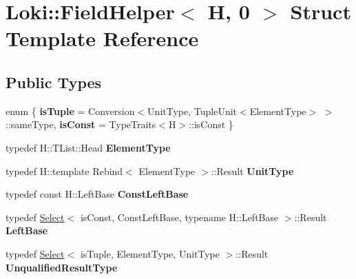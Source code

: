 \hypertarget{structLoki_1_1FieldHelper_3_01H_00_010_01_4}{}\section{Loki\+:\+:Field\+Helper$<$ H, 0 $>$ Struct Template Reference}
\label{structLoki_1_1FieldHelper_3_01H_00_010_01_4}
\subsection*{Public Types}
\begin{DoxyCompactItemize}
\item 
\hypertarget{structLoki_1_1FieldHelper_3_01H_00_010_01_4_aee3342286b1cd06bef64f33a0c847fde}{}enum \{ {\bfseries is\+Tuple} = Conversion$<$Unit\+Type, Tuple\+Unit$<$Element\+Type$>$ $>$\+:\+:same\+Type, 
{\bfseries is\+Const} = Type\+Traits$<$H$>$\+:\+:is\+Const
 \}\label{structLoki_1_1FieldHelper_3_01H_00_010_01_4_aee3342286b1cd06bef64f33a0c847fde}

\item 
\hypertarget{structLoki_1_1FieldHelper_3_01H_00_010_01_4_a8219b77cf851abe0c2a42100a393226d}{}typedef H\+::\+T\+List\+::\+Head {\bfseries Element\+Type}\label{structLoki_1_1FieldHelper_3_01H_00_010_01_4_a8219b77cf851abe0c2a42100a393226d}

\item 
\hypertarget{structLoki_1_1FieldHelper_3_01H_00_010_01_4_a6217c6729e3c3d448782e4da310c184a}{}typedef H\+::template Rebind$<$ Element\+Type $>$\+::Result {\bfseries Unit\+Type}\label{structLoki_1_1FieldHelper_3_01H_00_010_01_4_a6217c6729e3c3d448782e4da310c184a}

\item 
\hypertarget{structLoki_1_1FieldHelper_3_01H_00_010_01_4_ab03a7b0b0ead1de2d4f0bad11c755a17}{}typedef const H\+::\+Left\+Base {\bfseries Const\+Left\+Base}\label{structLoki_1_1FieldHelper_3_01H_00_010_01_4_ab03a7b0b0ead1de2d4f0bad11c755a17}

\item 
\hypertarget{structLoki_1_1FieldHelper_3_01H_00_010_01_4_a8877388fc31620d5ffeed83c162b6e39}{}typedef \hyperlink{structLoki_1_1Select}{Select}$<$ is\+Const, Const\+Left\+Base, typename H\+::\+Left\+Base $>$\+::Result {\bfseries Left\+Base}\label{structLoki_1_1FieldHelper_3_01H_00_010_01_4_a8877388fc31620d5ffeed83c162b6e39}

\item 
\hypertarget{structLoki_1_1FieldHelper_3_01H_00_010_01_4_af27d1f1404f028e7a1ca00b5ba8cb9ce}{}typedef \hyperlink{structLoki_1_1Select}{Select}$<$ is\+Tuple, Element\+Type, Unit\+Type $>$\+::Result {\bfseries Unqualified\+Result\+Type}\label{structLoki_1_1FieldHelper_3_01H_00_010_01_4_af27d1f1404f028e7a1ca00b5ba8cb9ce}


\end{DoxyCompactItemize}
